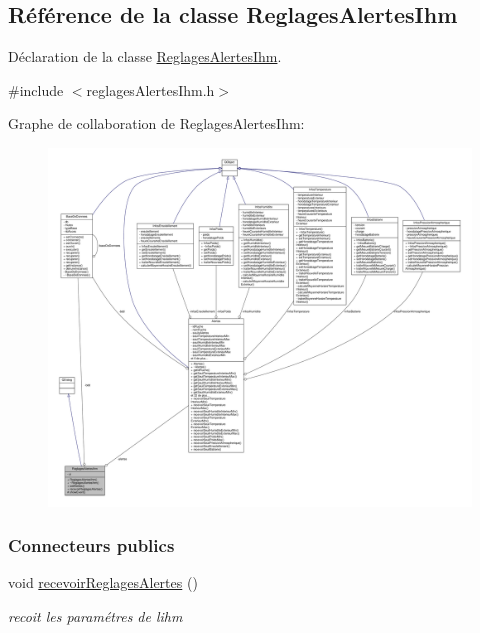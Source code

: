 \hypertarget{class_reglages_alertes_ihm}{}\subsection{Référence de la classe Reglages\+Alertes\+Ihm}
\label{class_reglages_alertes_ihm}


Déclaration de la classe \hyperlink{class_reglages_alertes_ihm}{Reglages\+Alertes\+Ihm}.  




{\ttfamily \#include $<$reglages\+Alertes\+Ihm.\+h$>$}



Graphe de collaboration de Reglages\+Alertes\+Ihm\+:\nopagebreak
\begin{figure}[H]
\begin{center}
\leavevmode
\includegraphics[width=350pt]{class_reglages_alertes_ihm__coll__graph}
\end{center}
\end{figure}
\subsubsection*{Connecteurs publics}
\begin{DoxyCompactItemize}
\item 
void \hyperlink{class_reglages_alertes_ihm_a5c40f718b28b948a90574ef0c2d3e587}{recevoir\+Reglages\+Alertes} ()
\begin{DoxyCompactList}\small\item\em recoit les paramétres de l\textquotesingle{}ihm \end{DoxyCompactList}\end{DoxyCompactItemize}
